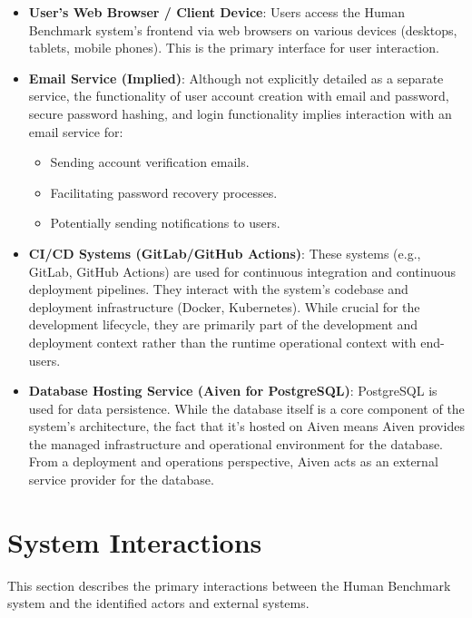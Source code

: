 \begin{itemize}
    \item \textbf{User's Web Browser / Client Device}: Users access the Human Benchmark system's frontend via web browsers on various devices (desktops, tablets, mobile phones). This is the primary interface for user interaction.
    \item \textbf{Email Service (Implied)}: Although not explicitly detailed as a separate service, the functionality of user account creation with email and password, secure password hashing, and login functionality implies interaction with an email service for:
    \begin{itemize}
        \item Sending account verification emails.
        \item Facilitating password recovery processes.
        \item Potentially sending notifications to users.
    \end{itemize}
    \item \textbf{CI/CD Systems (GitLab/GitHub Actions)}: These systems (e.g., GitLab, GitHub Actions) are used for continuous integration and continuous deployment pipelines. They interact with the system's codebase and deployment infrastructure (Docker, Kubernetes). While crucial for the development lifecycle, they are primarily part of the development and deployment context rather than the runtime operational context with end-users.
    \item \textbf{Database Hosting Service (Aiven for PostgreSQL)}: PostgreSQL is used for data persistence. While the database itself is a core component of the system's architecture, the fact that it's hosted on Aiven means Aiven provides the managed infrastructure and operational environment for the database. From a deployment and operations perspective, Aiven acts as an external service provider for the database.
\end{itemize}

\section{System Interactions}
This section describes the primary interactions between the Human Benchmark system and the identified actors and external systems.

